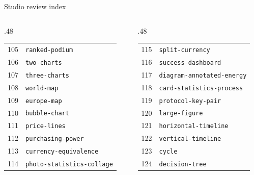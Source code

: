 \documentclass[aspectratio=169]{beamer}
\begin{document}
\begin{frame}{Studio review index}\fontsize{6.5}{9}\selectfont\begin{columns}[T]
\begin{column}{.48\textwidth}\begin{tabular}{rl}
105 & \texttt{ranked-podium} \\
106 & \texttt{two-charts} \\
107 & \texttt{three-charts} \\
108 & \texttt{world-map} \\
109 & \texttt{europe-map} \\
110 & \texttt{bubble-chart} \\
111 & \texttt{price-lines} \\
112 & \texttt{purchasing-power} \\
113 & \texttt{currency-equivalence} \\
114 & \texttt{photo-statistics-collage} \\
\end{tabular}\end{column}
\begin{column}{.48\textwidth}\begin{tabular}{rl}
115 & \texttt{split-currency} \\
116 & \texttt{success-dashboard} \\
117 & \texttt{diagram-annotated-energy} \\
118 & \texttt{card-statistics-process} \\
119 & \texttt{protocol-key-pair} \\
120 & \texttt{large-figure} \\
121 & \texttt{horizontal-timeline} \\
122 & \texttt{vertical-timeline} \\
123 & \texttt{cycle} \\
124 & \texttt{decision-tree} \\
\end{tabular}\end{column}
\end{columns}\end{frame}
\end{document}
